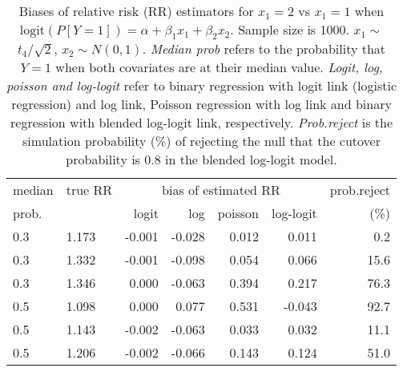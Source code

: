 \documentclass[12pt,a4paper]{article}
\begin{document}
\begin{table}[H] 
\small\sf\centering 
\caption{Biases of relative risk (RR) estimators for $x_1=2$ vs $x_1=1$ when $\mbox{logit}(P[Y=1])=\alpha+\beta_1 x_1 + \beta_2 x_2$. Sample size is 1000. $x_1 \sim $$t_4/\sqrt{2}$, $x_2 \sim N(0,1)$. {\it Median prob} refers to the probability that $Y=1$ when both covariates are at their median value. {\it Logit, log, poisson and log-logit} refer to binary regression with logit link (logistic regression) and log link, Poisson regression with log link and binary regression with blended log-logit link, respectively. {\it Prob.reject} is the simulation probability (\%) of rejecting the null that the cutover probability is $0.8$ in the blended log-logit model.} 
\begin{tabular}{llrrrrr} 
\toprule 
median & true RR & \multicolumn{4}{c}{bias of estimated RR} & prob.reject \\ 
prob. & & logit & log & poisson & log-logit  & (\%) \\ \midrule 
0.3 & 1.173 & -0.001 & -0.028 & 0.012 &  0.011 &  0.2 \\  
0.3 & 1.332 & -0.001 & -0.098 & 0.054 &  0.066 & 15.6 \\  
0.3 & 1.346 &  0.000 & -0.063 & 0.394 &  0.217 & 76.3 \\  
0.5 & 1.098 &  0.000 &  0.077 & 0.531 & -0.043 & 92.7 \\  
0.5 & 1.143 & -0.002 & -0.063 & 0.033 &  0.032 & 11.1 \\  
0.5 & 1.206 & -0.002 & -0.066 & 0.143 &  0.124 & 51.0 \\  
\bottomrule 
\end{tabular} 
\end{table} 
\end{document}
